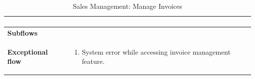 \documentclass[../thesis.tex]{subfiles}
\begin{document}
\begin{center}
\begin{table}[H]
{\begin{tabular}[htbp]{|p{}|p{}|}
\begin{enumerate}
                                                   \end{enumerate}                             \\ \hline
                \textbf{Subflows              }  &                                                                                    \\ \hline
                \textbf{Exceptional flow       } & \begin{enumerate}
                                                       \item System error while accessing invoice management feature.
                                                   \end{enumerate}                     \\ \hline
            \end{tabular}%
        }
        \caption{Sales Management: Manage Invoices}
        \label{tab:table-usecase-manage-invoices}
    \end{table}
\end{center}
\end{document}
